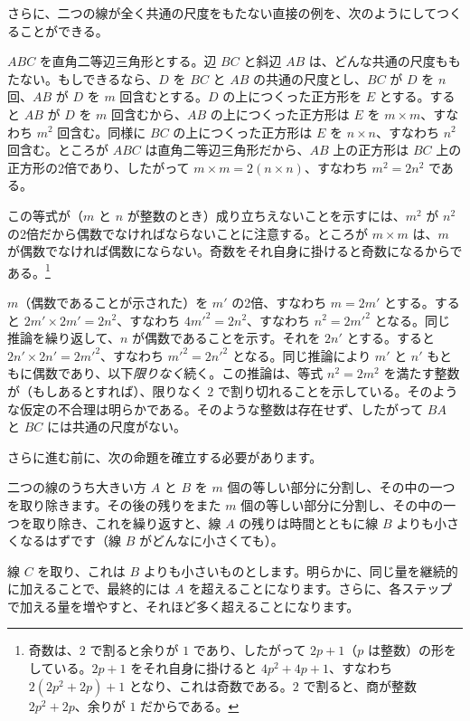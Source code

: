 \documentclass[a4paper,11pt,openany]{ltjsbook}
\begin{document}
さらに、二つの線が全く共通の尺度をもたない直接の例を、次のようにしてつくることができる。

$ABC$ を直角二等辺三角形とする。辺 $BC$ と斜辺 $AB$ は、どんな共通の尺度ももたない。もしできるなら、$D$ を $BC$ と $AB$ の共通の尺度とし、$BC$ が $D$ を $n$ 回、$AB$ が $D$ を $m$ 回含むとする。$D$ の上につくった正方形を $E$ とする。すると $AB$ が $D$ を $m$ 回含むから、$AB$ の上につくった正方形は $E$ を $m \times m$、すなわち $m^{2}$ 回含む。同様に $BC$ の上につくった正方形は $E$ を $n \times n$、すなわち $n^{2}$ 回含む。ところが $ABC$ は直角二等辺三角形だから、$AB$ 上の正方形は $BC$ 上の正方形の2倍であり、したがって $m \times m = 2(n \times n)$、すなわち $m^{2} = 2n^{2}$ である。

この等式が（$m$ と $n$ が整数のとき）成り立ちえないことを示すには、$m^{2}$ が $n^{2}$ の2倍だから偶数でなければならないことに注意する。ところが $m \times m$ は、$m$ が偶数でなければ偶数にならない。奇数をそれ自身に掛けると奇数になるからである。\footnote{奇数は、$2$ で割ると余りが $1$ であり、したがって $2p + 1$（$p$ は整数）の形をしている。$2p + 1$ をそれ自身に掛けると $4p^{2} + 4p + 1$、すなわち $2(2p^{2} + 2p) + 1$ となり、これは奇数である。$2$ で割ると、商が整数 $2p^{2} + 2p$、余りが $1$ だからである。}

$m$（偶数であることが示された）を $m'$ の2倍、すなわち $m = 2m'$ とする。すると $2m' \times 2m' = 2n^{2}$、すなわち $4m'^{2} = 2n^{2}$、すなわち $n^{2} = 2m'^{2}$ となる。同じ推論を繰り返して、$n$ が偶数であることを示す。それを $2n'$ とする。すると $2n' \times 2n' = 2m'^{2}$、すなわち $m'^{2} = 2n'^{2}$ となる。同じ推論により $m'$ と $n'$ もともに偶数であり、以下\emph{限りなく}続く。この推論は、等式 $n^{2} = 2m^{2}$ を満たす整数が（もしあるとすれば）、限りなく $2$ で割り切れることを示している。そのような仮定の不合理は明らかである。そのような整数は存在せず、したがって $BA$ と $BC$ には共通の尺度がない。

さらに進む前に、次の命題を確立する必要があります。

二つの線のうち大きい方 $A$ と $B$ を $m$ 個の等しい部分に分割し、その中の一つを取り除きます。その後の残りをまた $m$ 個の等しい部分に分割し、その中の一つを取り除き、これを繰り返すと、線 $A$ の残りは時間とともに線 $B$ よりも小さくなるはずです（線 $B$ がどんなに小さくても）。

線 $C$ を取り、これは $B$ よりも小さいものとします。明らかに、同じ量を継続的に加えることで、最終的には $A$ を超えることになります。さらに、各ステップで加える量を増やすと、それほど多く超えることになります。
\end{document}

